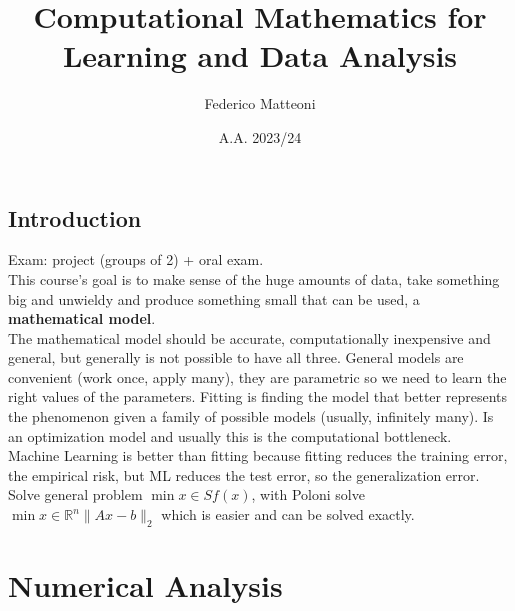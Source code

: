 \documentclass[10pt]{report}
\begin{document}
\title{Computational Mathematics for Learning and Data Analysis}
\author{Federico Matteoni}
\date{A.A. 2023/24}
\renewcommand*\contentsname{Index}

\maketitle
\tableofcontents
\pagebreak
\section{Introduction}
Exam: project (groups of 2) + oral exam.\\
This course's goal is to make sense of the huge amounts of data, take something big and unwieldy and produce something small that can be used, a \textbf{mathematical model}.\\
The mathematical model should be accurate, computationally inexpensive and general, but generally is not possible to have all three. General models are convenient (work once, apply many), they are parametric so we need to learn the right values of the parameters. Fitting is finding the model that better represents the phenomenon given a family of possible models (usually, infinitely many). Is an optimization model and usually this is the computational bottleneck.\\
Machine Learning is better than fitting because fitting reduces the training error, the empirical risk, but ML reduces the test error, so the generalization error.\\
Solve general problem $\min{x\in S}f(x)$, with Poloni solve $\min{x\in \mathbb{R}^n}\|Ax - b\|_2$ which is easier and can be solved exactly.
\chapter{Numerical Analysis}
\end{document}
